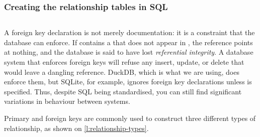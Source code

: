 \begin{frame}[plain]
    \label{s:moviedb-ddl2}
    \frametitle{Creating the relationship tables in SQL}
    \inputminted[fontsize=\scriptsize]{sql}{code/movies-relationships.sql}
\end{frame}
\label{l:moviedb-ddl2}

A foreign key declaration is not merely documentation: it is a constraint that the database can enforce.
If  contains a  that does not appear in , the reference points at nothing, and the database is said to have lost \emph{referential integrity}.
A database system that enforces foreign keys will refuse any insert, update, or delete that would leave a dangling reference.
DuckDB, which is what we are using, does enforce them, but SQLite, for example, ignores foreign key declarations unless  is specified.
Thus, despite SQL being standardised, you can still find significant variations in behaviour between systems.

Primary and foreign keys are commonly used to construct three different types of relationship, as shown on \autoref{l:relationship-types}.

